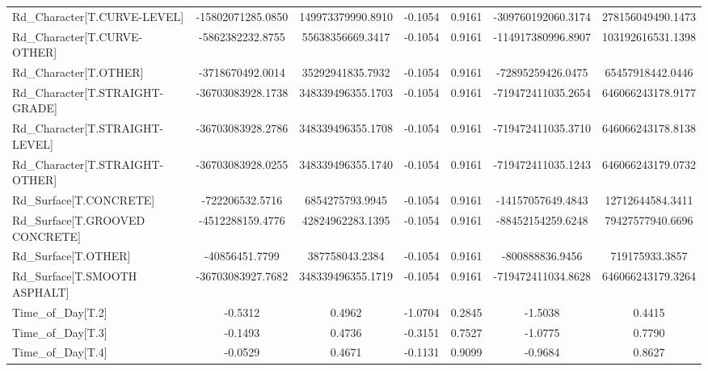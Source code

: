 \begin{longtable}{p{4cm}cccccc}
Rd\_Character[T.CURVE-LEVEL]                        & -15802071285.0850 & 149973379990.8910 & -0.1054 &       0.9161 & -309760192060.3174 & 278156049490.1473 \\
Rd\_Character[T.CURVE-OTHER]                        &  -5862382232.8755 &  55638356669.3417 & -0.1054 &       0.9161 & -114917380996.8907 & 103192616531.1398 \\
Rd\_Character[T.OTHER]                              &  -3718670492.0014 &  35292941835.7932 & -0.1054 &       0.9161 &  -72895259426.0475 &  65457918442.0446 \\
Rd\_Character[T.STRAIGHT-GRADE]                     & -36703083928.1738 & 348339496355.1703 & -0.1054 &       0.9161 & -719472411035.2654 & 646066243178.9177 \\
Rd\_Character[T.STRAIGHT-LEVEL]                     & -36703083928.2786 & 348339496355.1708 & -0.1054 &       0.9161 & -719472411035.3710 & 646066243178.8138 \\
Rd\_Character[T.STRAIGHT-OTHER]                     & -36703083928.0255 & 348339496355.1740 & -0.1054 &       0.9161 & -719472411035.1243 & 646066243179.0732 \\
Rd\_Surface[T.CONCRETE]                             &   -722206532.5716 &   6854275793.9945 & -0.1054 &       0.9161 &  -14157057649.4843 &  12712644584.3411 \\
Rd\_Surface[T.GROOVED CONCRETE]                     &  -4512288159.4776 &  42824962283.1395 & -0.1054 &       0.9161 &  -88452154259.6248 &  79427577940.6696 \\
Rd\_Surface[T.OTHER]                                &    -40856451.7799 &    387758043.2384 & -0.1054 &       0.9161 &    -800888836.9456 &    719175933.3857 \\
Rd\_Surface[T.SMOOTH ASPHALT]                       & -36703083927.7682 & 348339496355.1719 & -0.1054 &       0.9161 & -719472411034.8628 & 646066243179.3264 \\
Time\_of\_Day[T.2]                                   &           -0.5312 &            0.4962 & -1.0704 &       0.2845 &            -1.5038 &            0.4415 \\
Time\_of\_Day[T.3]                                   &           -0.1493 &            0.4736 & -0.3151 &       0.7527 &            -1.0775 &            0.7790 \\
Time\_of\_Day[T.4]                                   &           -0.0529 &            0.4671 & -0.1131 &       0.9099 &            -0.9684 &            0.8627 \\

\end{longtable}
